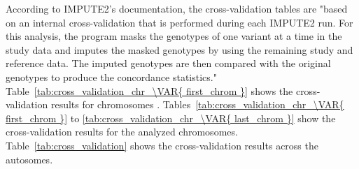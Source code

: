 
According to IMPUTE2's documentation, the cross-validation tables are "based on
an internal cross-validation that is performed during each IMPUTE2 run. For
this analysis, the program masks the genotypes of one variant at a time in the
study data and imputes the masked genotypes by using the remaining study and
reference data. The imputed genotypes are then compared with the original
genotypes to produce the concordance statistics."\\

Table~\ref{tab:cross_validation_chr_\VAR{ first_chrom }} shows the
cross-validation results for chromosomes .
Tables~\ref{tab:cross_validation_chr_\VAR{ first_chrom }} to
\ref{tab:cross_validation_chr_\VAR{ last_chrom }} show the cross-validation
results for the analyzed chromosomes. Table~\ref{tab:cross_validation} shows
the cross-validation results across the autosomes.


\pagebreak

